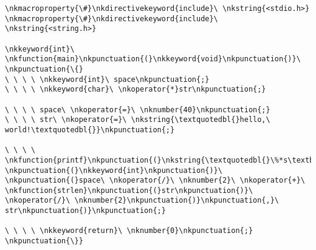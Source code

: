 \documentclass[10pt]{article}
\newcommand{\nkmacroproperty}[1]{{\color{nkmacropropertycol}#1}}
\newcommand{\nkdirectivekeyword}[1]{{\color{nkdirectivekeywordcol}#1}}
\newcommand{\nkstring}[1]{{\color{nkstringcol}#1}}
\newcommand{\nkkeyword}[1]{{\color{nkkeywordcol}#1}}
\newcommand{\nkfunction}[1]{{\color{nkfunctioncol}#1}}
\newcommand{\nkpunctuation}[1]{{\color{nkpunctuationcol}#1}}
\newcommand{\nkoperator}[1]{{\color{nkoperatorcol}#1}}
\newcommand{\nknumber}[1]{{\color{nknumbercol}#1}}
\begin{document}
    \shaded
\begin{Verbatim}[commandchars=\\\{\}]
\nkmacroproperty{\#}\nkdirectivekeyword{include}\ \nkstring{<stdio.h>}
\nkmacroproperty{\#}\nkdirectivekeyword{include}\ \nkstring{<string.h>}

\nkkeyword{int}\ \nkfunction{main}\nkpunctuation{(}\nkkeyword{void}\nkpunctuation{)}\ \nkpunctuation{\{}
\ \ \ \ \nkkeyword{int}\ space\nkpunctuation{;}
\ \ \ \ \nkkeyword{char}\ \nkoperator{*}str\nkpunctuation{;}

\ \ \ \ space\ \nkoperator{=}\ \nknumber{40}\nkpunctuation{;}
\ \ \ \ str\ \nkoperator{=}\ \nkstring{\textquotedbl{}hello,\ world!\textquotedbl{}}\nkpunctuation{;}

\ \ \ \ \nkfunction{printf}\nkpunctuation{(}\nkstring{\textquotedbl{}\%*s\textbackslash{}n\textquotedbl{}}\nkpunctuation{,}\ \nkpunctuation{(}\nkkeyword{int}\nkpunctuation{)}\ \nkpunctuation{(}space\ \nkoperator{/}\ \nknumber{2}\ \nkoperator{+}\ \nkfunction{strlen}\nkpunctuation{(}str\nkpunctuation{)}\ \nkoperator{/}\ \nknumber{2}\nkpunctuation{)}\nkpunctuation{,}\ str\nkpunctuation{)}\nkpunctuation{;}

\ \ \ \ \nkkeyword{return}\ \nknumber{0}\nkpunctuation{;}
\nkpunctuation{\}}
\end{Verbatim}
    \endshaded
\end{document}
